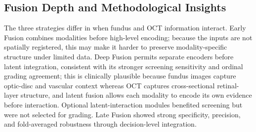 \documentclass[sn-mathphys]{sn-jnl}%
\theoremstyle{thmstyleone}%
\theoremstyle{thmstyletwo}%
\theoremstyle{thmstylethree}%
\begin{document}
\begin{table}[!t]
    \centering
    \caption{Summary of the official test-set results for binary glaucoma screening and multiclass glaucoma grading.}
    \label{tab:summary_results}
    \scriptsize
\end{table}

\subsection{Fusion Depth and Methodological Insights}
\label{subsec:fusion_depth_discussion}

The three strategies differ in when fundus and OCT information interact. Early Fusion combines modalities before high-level encoding; because the inputs are not spatially registered, this may make it harder to preserve modality-specific structure under limited data. Deep Fusion permits separate encoders before latent integration, consistent with its stronger screening sensitivity and ordinal grading agreement; this is clinically plausible because fundus images capture optic-disc and vascular context whereas OCT captures cross-sectional retinal-layer structure, and latent fusion allows each modality to encode its own evidence before interaction. Optional latent-interaction modules benefited screening but were not selected for grading. Late Fusion showed strong specificity, precision, and fold-averaged robustness through decision-level integration.
\end{document}
